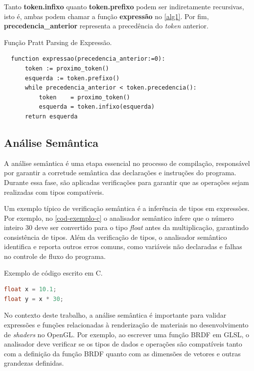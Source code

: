 \documentclass[english,
               brazil,
               bsc] %
               {dcomp-abntex2}
\begin{document}
Tanto \textbf{token.infixo} quanto \textbf{token.prefixo} podem ser indiretamente recursivas, isto é, ambas podem chamar a função \textbf{expressão} no \autoref{alg1}. 
Por fim, \textbf{precedencia\_anterior} representa a precedência do \textit{token} anterior.


\begin{algoritmo}[H]
        \caption{\small Função Pratt Parsing de Expressão.}
        \label{alg1}
  \begin{lstlisting}
  function expressao(precedencia_anterior:=0):
      token := proximo_token()
      esquerda := token.prefixo()
      while precedencia_anterior < token.precedencia():
          token    = proximo_token()
          esquerda = token.infixo(esquerda)
      return esquerda
  \end{lstlisting}
\end{algoritmo}


\subsection{Análise Semântica}


A análise semântica é uma etapa essencial no processo de compilação, responsável por garantir a corretude semântica das declarações e instruções do programa. Durante essa fase, são aplicadas verificações para garantir que as operações sejam realizadas com tipos compatíveis.


Um exemplo típico de verificação semântica é a inferência de tipos em expressões. Por exemplo, no \autoref{cod-exemplo-c} o analisador semântico infere que o número inteiro $30$ deve ser convertido para o tipo \textit{float} antes da multiplicação, garantindo consistência de tipos. Além da verificação de tipos, o analisador semântico identifica e reporta outros erros comuns, como variáveis não declaradas e falhas no controle de fluxo do programa.


\begin{codigo}
\caption{\small Exemplo de código escrito em C.}
  \label{cod-exemplo-c}
\begin{lstlisting}[language=C]
float x = 10.1;
float y = x * 30;
\end{lstlisting}
\end{codigo}



No contexto deste trabalho, a análise semântica é importante para validar expressões e funções relacionadas à renderização de materiais no desenvolvimento de \textit{shaders} no OpenGL. Por exemplo, ao escrever uma função BRDF em GLSL, o analisador deve verificar se os tipos de dados e operações são compatíveis tanto com a definição da função BRDF quanto com as dimensões de vetores e outras grandezas definidas.
\end{document}

